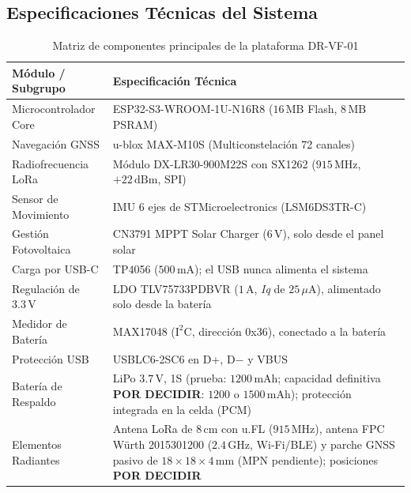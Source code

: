 \subsection{Especificaciones Técnicas del Sistema}

\begin{table}[H]
\centering
\caption{Matriz de componentes principales de la plataforma DR-VF-01}
\label{tab:componentes_principales}
\vspace{2mm}
\begin{tabularx}{\textwidth}{X X}
\toprule
\rowcolor{categorybg}
\textbf{Módulo / Subgrupo} & \textbf{Especificación Técnica} \\
\midrule
Microcontrolador Core & ESP32-S3-WROOM-1U-N16R8 ($16\,\text{MB}$ Flash, $8\,\text{MB}$ PSRAM) \\
\rowcolor{rowalt}
Navegación GNSS & u-blox MAX-M10S (Multiconstelación 72 canales) \\
Radiofrecuencia LoRa & Módulo DX-LR30-900M22S con SX1262 ($915\,\text{MHz}$, $+22\,\text{dBm}$, SPI) \\
\rowcolor{rowalt}
Sensor de Movimiento & IMU 6 ejes de STMicroelectronics (LSM6DS3TR-C) \\
Gestión Fotovoltaica & CN3791 MPPT Solar Charger ($6\,\text{V}$), solo desde el panel solar \\
\rowcolor{rowalt}
Carga por USB-C & TP4056 ($500\,\text{mA}$); el USB nunca alimenta el sistema \\
Regulación de $3.3\,\text{V}$ & LDO TLV75733PDBVR ($1\,\text{A}$, \textit{Iq} de $25\,\mu\text{A}$), alimentado solo desde la batería \\
\rowcolor{rowalt}
Medidor de Batería & MAX17048 ($\text{I}^2\text{C}$, dirección 0x36), conectado a la batería \\
Protección USB & USBLC6-2SC6 en D+, D$-$ y VBUS \\
\rowcolor{rowalt}
Batería de Respaldo & LiPo $3.7\,\text{V}$, 1S (prueba: $1200\,\text{mAh}$; capacidad definitiva \textbf{POR DECIDIR}: $1200$ o $1500\,\text{mAh}$); protección integrada en la celda (PCM) \\
Elementos Radiantes & Antena LoRa de $8\,\text{cm}$ con u.FL ($915\,\text{MHz}$), antena FPC Würth 2015301200 ($2.4\,\text{GHz}$, Wi-Fi/BLE) y parche GNSS pasivo de $18\times18\times4\,\text{mm}$ (MPN pendiente); posiciones \textbf{POR DECIDIR} \\
\bottomrule
\end{tabularx}
\end{table}

